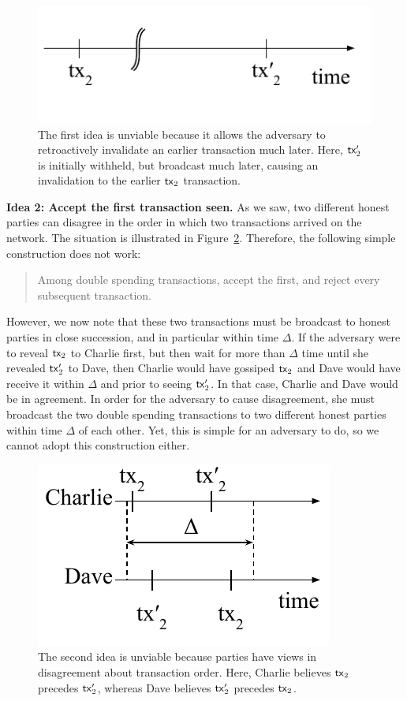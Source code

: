 \begin{figure}[h]
    \centering
    \includegraphics[width=0.4 \columnwidth,keepaspectratio]{figures/simple-idea-1.pdf}
    \caption{The first idea is unviable because it allows the
    adversary to retroactively invalidate an earlier transaction much later. Here, $\mathsf{tx}_2'$
    is initially withheld, but broadcast much later, causing an invalidation to the earlier
    $\mathsf{tx}_2$ transaction.}
    \label{fig.simple-idea-1}
\end{figure}

\noindent
\textbf{Idea 2: Accept the first transaction seen.} As we saw, two different honest parties can disagree in
the order in which two transactions arrived on the network. The situation is illustrated in
Figure~\ref{fig.simple-idea-2}. Therefore, the following simple construction does not work:

\begin{quote}
  Among double spending transactions, accept the first, and reject every subsequent transaction.
\end{quote}

However, we now note that these two transactions must be broadcast
to honest parties in close succession, and in particular within time $\Delta$. If the adversary
were to reveal $\mathsf{tx}_2$ to Charlie first, but then wait for more than $\Delta$ time until she revealed
$\mathsf{tx}_2'$ to Dave, then Charlie would have gossiped $\mathsf{tx}_2$ and Dave would have receive it within $\Delta$
and prior to seeing $\mathsf{tx}_2'$. In that case, Charlie and Dave would be in agreement.
In order for the adversary to cause disagreement, she must broadcast the two double spending
transactions to two different honest parties within time $\Delta$ of each other. Yet, this is
simple for an adversary to do, so we cannot adopt this construction either.

\begin{figure}[h]
    \centering
    \includegraphics[width=0.325 \columnwidth,keepaspectratio]{figures/simple-idea-2.pdf}
    \caption{The second idea is unviable because parties
    have views in disagreement about transaction order. Here, Charlie believes $\mathsf{tx}_2$
    precedes $\mathsf{tx}_2'$, whereas Dave believes $\mathsf{tx}_2'$ precedes $\mathsf{tx}_2$.}
    \label{fig.simple-idea-2}
\end{figure}

